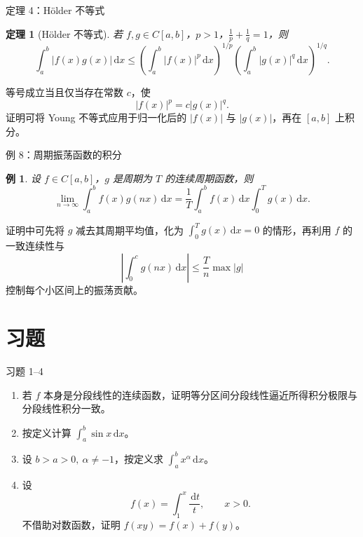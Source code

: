 ﻿\documentclass[aspectratio=169,11pt]{ctexbeamer}
\newtheorem{mythm}{定理}
\newtheorem{myex}{例}
\newcommand{\dd}{\,\mathrm{d}}
\newcommand{\abs}[1]{\left|#1\right|}
\begin{document}
\begin{frame}{定理 4：Hölder 不等式}
  \begin{mythm}[Hölder 不等式]
  若 $f,g\in C[a,b]$，$p>1$，$\frac1p+\frac1q=1$，则
  \[
    \int_a^b\abs{f(x)g(x)}\dd x
    \le
    \left(\int_a^b\abs{f(x)}^p\dd x\right)^{1/p}
    \left(\int_a^b\abs{g(x)}^q\dd x\right)^{1/q}.
  \]
  \end{mythm}
  等号成立当且仅当存在常数 $c$，使
  \[
    \abs{f(x)}^p=c\abs{g(x)}^q.
  \]
  证明可将 Young 不等式应用于归一化后的
  $\abs{f(x)}$ 与 $\abs{g(x)}$，再在 $[a,b]$ 上积分。
\end{frame}

\begin{frame}{例 8：周期振荡函数的积分}
  \small
  \begin{myex}
  设 $f\in C[a,b]$，$g$ 是周期为 $T$ 的连续周期函数，则
  \[
    \lim_{n\to\infty}\int_a^b f(x)g(nx)\dd x
    =\frac1T\int_a^b f(x)\dd x\int_0^T g(x)\dd x.
  \]
  \end{myex}
  证明中可先将 $g$ 减去其周期平均值，化为
  $\int_0^T g(x)\dd x=0$ 的情形，再利用 $f$ 的一致连续性与
  \[
    \abs{\int_0^c g(nx)\dd x}\le \frac{T}{n}\max\abs{g}
  \]
  控制每个小区间上的振荡贡献。

  \begin{center}
  \end{center}
\end{frame}

\section{习题}

\begin{frame}{习题 1--4}
  \begin{enumerate}
    \item 若 $f$ 本身是分段线性的连续函数，证明等分区间分段线性逼近所得积分极限与分段线性积分一致。
    \item 按定义计算 $\displaystyle\int_a^b\sin x\dd x$。
    \item 设 $b>a>0,\ \alpha\ne-1$，按定义求 $\displaystyle\int_a^b x^\alpha\dd x$。
    \item 设
    \[
      f(x)=\int_1^x\frac{\dd t}{t},\qquad x>0.
    \]
    不借助对数函数，证明 $f(xy)=f(x)+f(y)$。
  \end{enumerate}
\end{frame}
\end{document}

